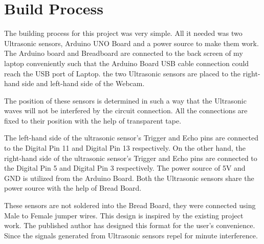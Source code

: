 \documentclass[12pt,journal]{IEEEtran}
\begin{document}
\section{Build Process}
The building process for this project was very simple. All it needed was two Ultrasonic sensors, Arduino UNO Board and a power source to make them work.  The Arduino board and Breadboard are connected to the back screen of my laptop conveniently such that the Arduino Board USB cable connection could reach the USB port of Laptop. the two Ultrasonic sensors are placed to the right-hand side and left-hand side of the Webcam. 
\newpage

\par The position of these sensors is determined in such a way that the Ultrasonic waves will not be interfered by the circuit connection. All the connections are fixed to their position with the help of transparent tape. 
\par 
The left-hand side of the ultrasonic sensor’s Trigger and Echo pins are connected to the Digital Pin 11 and Digital Pin 13 respectively. On the other hand, the right-hand side of the ultrasonic sensor’s Trigger and Echo pins are connected to the Digital Pin 5 and Digital Pin 3 respectively. The power source of 5V and GND is utilized from the Arduino Board. Both the Ultrasonic sensors share the power source with the help of Bread Board.
\par These sensors are not soldered into the Bread Board, they were connected using Male to Female jumper wires. This design is inspired by the existing project work. The published author has designed this format for the user’s convenience. Since the signals generated from Ultrasonic sensors repel for minute interference. 
\end{document}
